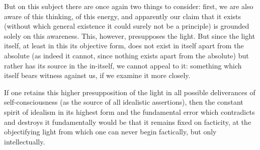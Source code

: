 But on this subject there are once again two things to consider:
first, we are also aware of this thinking, of this energy,
and apparently our claim that it exists
(without which general existence it could surely not be a principle)
is grounded solely on this awareness.
This, however, presupposes the light.
But since the light itself, at least in this its objective form,
does not exist in itself apart from the absolute
(as indeed it cannot, since nothing exists apart from the absolute)
but rather has its source in the in-itself,
we cannot appeal to it:
something which itself bears witness against us,
if we examine it more closely.

If one retains this higher presupposition of
the light in all possible deliverances of self-consciousness
(as the source of all idealistic assertions),
then the constant spirit of idealism in its highest form
and the fundamental error which contradicts and destroys it
fundamentally would be that it remains fixed on facticity,
at the objectifying light from which one can never
begin factically, but only intellectually.

